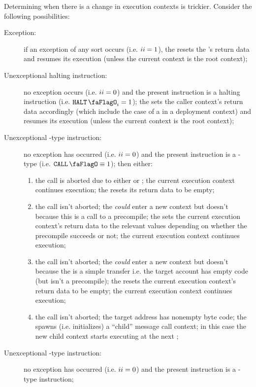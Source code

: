 Determining when there is a change in execution contexts is trickier.
Consider the following possibilities:
\begin{description}
	\item[Exception:]
		if an exception of any sort occurs (i.e. $\xAhoy_{i} = 1$), the \zkEvm{} resets the \caller{}'s return data 
		and resumes its execution (unless the current context is the root context);
	\item[Unexceptional halting instruction:]
		no exception occurs (i.e. $\xAhoy_{i} = 0$) and the present instruction is a halting instruction (i.e. $\haltFlag_{i} = 1$);
		the \zkEvm{} sets the caller context's return data accordingly (which include the case of a  in a deployment context)
		and resumes its execution (unless the current context is the root context);
	\item[Unexceptional -type instruction:]
		no exception has occurred (i.e. $\xAhoy_{i} = 0$) and the present instruction is a -type (i.e. $\callFlag \equiv 1$);
		then either:
		\begin{enumerate}
			\item
				the call is aborted due to either \balAbortSH{} or \csdAbortSH{};
				the current execution context continues execution;
				the \zkEvm{} resets its return data to be empty;
			\item
				the call isn't aborted;
				the \zkEvm{} \emph{could} enter a new context but doesn't because this is a call to a precompile;
				the \zkEvm{} sets the current execution context's return data to the relevant values depending on whether the precompile succeeds or not;
				the current execution context continues execution;
			\item
				the call isn't aborted;
				the \zkEvm{} \emph{could} enter a new context but doesn't because the  is a simple transfer i.e. the target account has empty code (but isn't a precompile);
				the \zkEvm{} resets the current execution context's return data to be empty;
				the current execution context continues execution;
			\item
				the call isn't aborted;
				the target address has nonempty byte code;
				the \zkEvm{} spawns (i.e. initializes) a ``child'' message call context;
				in this case the new child context starts executing at the next \hubStamp{};
		\end{enumerate}
	\item[Unexceptional -type instruction:]
		no exception has occurred (i.e. $\xAhoy_{i} = 0$) and the present instruction is a -type instruction;

\end{description}
